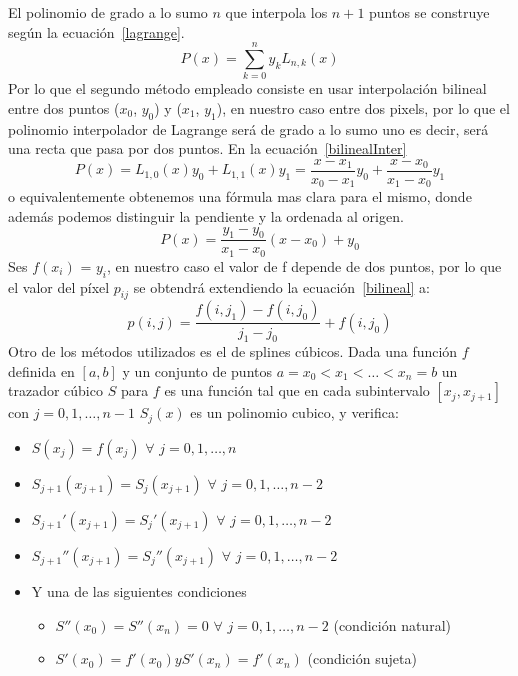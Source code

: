 \documentclass[a4paper]{article}
\begin{document}
El polinomio de grado a lo sumo $ n $ que interpola los $ n +1 $ puntos se construye según la ecuación~\ref{lagrange}.
\begin{equation}
P(x)= \sum_{k=0}^{n}y_{k}L_{n,k}(x)
\label{lagrange}
\end{equation}
Por lo que el segundo método empleado consiste en usar interpolación bilineal entre dos puntos ($ x_{0} $, $ y_{0} $) y ($ x_{1} $, $ y_{1} $), en nuestro caso entre dos pixels, por lo que el polinomio interpolador de Lagrange será de grado a lo sumo uno es decir, será una recta que pasa por dos puntos. En la ecuación~\ref{bilinealInter}
\begin{equation}
P(x)= L_{1,0}(x)y_{0} + L_{1,1}(x)y_{1} = \frac{x -x_{1}}{x_{0}-x_{1}}y_0 + \frac{x-x_{0}}{x_{1}-x_{0}} y_{1}
\label{bilinealInter}
\end{equation}
o equivalentemente obtenemos una f\'ormula mas clara para el mismo, donde además podemos distinguir la pendiente y la ordenada al origen.
\begin{equation}
P(x)= \frac{y_{1}-y_{0}}{x_{1}-x_{0}}(x - x_{0}) + y_{0}
\label{bilineal}
\end{equation}
Ses $f(x_i)$ = $y_i$, en nuestro caso el valor de f depende de dos puntos, por lo que el valor del píxel $p_{ij}$ se obtendrá extendiendo la ecuación~\ref{bilineal} a:
\begin{equation}
p(i, j) = \frac{f(i, j_1)-f(i,j_0)}{j_1 - j_0} + f(i,j_0)
\end{equation}
Otro de los métodos utilizados es el de splines cúbicos. Dada una función $f$ definida en $[a,b]$ y un conjunto de puntos $a=x_0<x_1<\ldots<x_n=b$ un trazador cúbico $S$ para $f$ es una función tal que en cada subintervalo $[x_j, x_{j+1}]$ con  $j=0,1,\ldots,n-1$ $S_j(x)$ es un polinomio cubico, y verifica:
\begin{itemize}
  \item $S(x_j)=f(x_j)$ $ \forall $ $j=0,1,\ldots,n$
  \item $S_{j+1}(x_{j+1})=S_j(x_{j+1})$ $ \forall $ $j=0,1,\ldots,n-2$
  \item $S_{j+1}'(x_{j+1})=S_j'(x_{j+1})$ $ \forall $ $j=0,1,\ldots,n-2$
  \item $S_{j+1}''(x_{j+1})=S_j''(x_{j+1})$ $ \forall $ $j=0,1,\ldots,n-2$
  \item Y una de las siguientes condiciones
        \begin{itemize}
                \item $S''(x_0)=S''(x_n)=0$ $ \forall $ $j=0,1,\ldots,n-2$ (condición natural)
                 \item $S'(x_0)=f'(x_0) y S'(x_n)=f'(x_n)$ (condición sujeta)
        \end{itemize}
\end{itemize}
\end{document}
